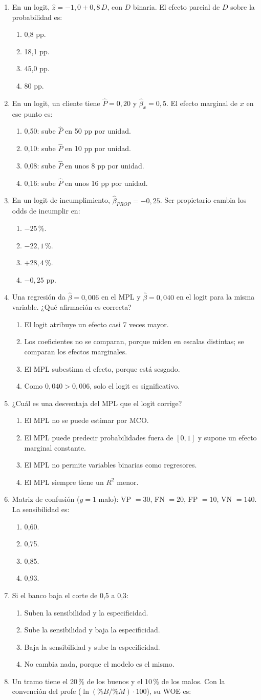\documentclass[11pt]{article}
\begin{document}
\newcommand{\alts}[4]{\begin{enumerate}[label=\alph*),itemsep=0pt,topsep=1pt,leftmargin=1.6em]\item #1 \item #2 \item #3 \item #4\end{enumerate}}
\begin{enumerate}[label=\textbf{SM\arabic*.},itemsep=4pt,leftmargin=2.8em]
\item En un logit, $\hat z=-1{,}0+0{,}8\,D$, con $D$ binaria. El efecto parcial de $D$ sobre la probabilidad es:
\alts{0,8 pp.}{18,1 pp.}{45,0 pp.}{80 pp.}
\item En un logit, un cliente tiene $\hat P=0{,}20$ y $\hat\beta_x=0{,}5$. El efecto marginal de $x$ en ese punto es:
\alts{0,50: sube $\hat P$ en 50 pp por unidad.}{0,10: sube $\hat P$ en 10 pp por unidad.}{0,08: sube $\hat P$ en unos 8 pp por unidad.}{0,16: sube $\hat P$ en unos 16 pp por unidad.}
\item En un logit de incumplimiento, $\hat\beta_{PROP}=-0{,}25$. Ser propietario cambia los odds de incumplir en:
\alts{$-25$\,\%.}{$-22{,}1$\,\%.}{$+28{,}4$\,\%.}{$-0{,}25$ pp.}
\item Una regresión da $\hat\beta=0{,}006$ en el MPL y $\hat\beta=0{,}040$ en el logit para la misma variable. ¿Qué afirmación es correcta?
\alts{El logit atribuye un efecto casi 7 veces mayor.}{Los coeficientes no se comparan, porque miden en escalas distintas; se comparan los efectos marginales.}{El MPL subestima el efecto, porque está sesgado.}{Como $0{,}040>0{,}006$, solo el logit es significativo.}
\item ¿Cuál es una desventaja del MPL que el logit corrige?
\alts{El MPL no se puede estimar por MCO.}{El MPL puede predecir probabilidades fuera de $[0,1]$ y supone un efecto marginal constante.}{El MPL no permite variables binarias como regresores.}{El MPL siempre tiene un $R^2$ menor.}
\item Matriz de confusión ($y=1$ malo): VP $=30$, FN $=20$, FP $=10$, VN $=140$. La sensibilidad es:
\alts{0,60.}{0,75.}{0,85.}{0,93.}
\item Si el banco baja el corte de 0,5 a 0,3:
\alts{Suben la sensibilidad y la especificidad.}{Sube la sensibilidad y baja la especificidad.}{Baja la sensibilidad y sube la especificidad.}{No cambia nada, porque el modelo es el mismo.}
\item Un tramo tiene el 20\,\% de los buenos y el 10\,\% de los malos. Con la convención del profe ($\ln(\%B/\%M)\cdot100$), su WOE es:

\end{enumerate}
\end{document}
